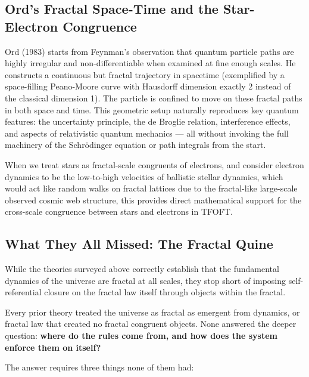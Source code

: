 \documentclass[11pt,a4paper]{article}
\begin{document}
\subsection{Ord's Fractal Space-Time and the Star-Electron Congruence}

Ord (1983) starts from Feynman's observation that quantum particle paths are highly irregular and non-differentiable when examined at fine enough scales. He constructs a continuous but fractal trajectory in spacetime (exemplified by a space-filling Peano-Moore curve with Hausdorff dimension exactly 2 instead of the classical dimension 1). The particle is confined to move on these fractal paths in both space and time. This geometric setup naturally reproduces key quantum features: the uncertainty principle, the de Broglie relation, interference effects, and aspects of relativistic quantum mechanics --- all without invoking the full machinery of the Schrödinger equation or path integrals from the start.

When we treat stars as fractal-scale congruents of electrons, and consider electron dynamics to be the low-to-high velocities of ballistic stellar dynamics, which would act like random walks on fractal lattices due to the fractal-like large-scale observed cosmic web structure, this provides direct mathematical support for the cross-scale congruence between stars and electrons in TFOFT.

\subsection{What They All Missed: The Fractal Quine}

While the theories surveyed above correctly establish that the fundamental dynamics of the universe are fractal at all scales, they stop short of imposing self-referential closure on the fractal law itself through objects within the fractal.

Every prior theory treated the universe as fractal as emergent from dynamics, or fractal law that created no fractal congruent objects. None answered the deeper question: \textbf{where do the rules come from, and how does the system enforce them on itself?}

The answer requires three things none of them had:
\end{document}
